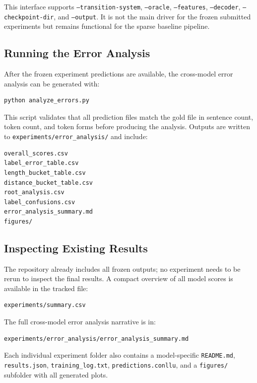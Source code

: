 \documentclass[12pt,letterpaper]{article}
\begin{document}
This interface supports \texttt{--transition-system}, \texttt{--oracle}, \texttt{--features}, \texttt{--decoder}, \texttt{--checkpoint-dir}, and \texttt{--output}. It is not the main driver for the frozen submitted experiments but remains functional for the sparse baseline pipeline.

\subsection{Running the Error Analysis}
\label{subsec:error_analysis}

After the frozen experiment predictions are available, the cross-model error analysis can be generated with:

\begin{verbatim}
python analyze_errors.py
\end{verbatim}

This script validates that all prediction files match the gold file in sentence count, token count, and token forms before producing the analysis. Outputs are written to \newline \texttt{experiments/error\_analysis/} and include:

\begin{verbatim}
overall_scores.csv
label_error_table.csv
length_bucket_table.csv
distance_bucket_table.csv
root_analysis.csv
label_confusions.csv
error_analysis_summary.md
figures/
\end{verbatim}

\subsection{Inspecting Existing Results}
\label{subsec:inspecting_results}

The repository already includes all frozen outputs; no experiment needs to be rerun to inspect the final results. A compact overview of all model scores is available in the tracked file:

\begin{verbatim}
experiments/summary.csv
\end{verbatim}

The full cross-model error analysis narrative is in:

\begin{verbatim}
experiments/error_analysis/error_analysis_summary.md
\end{verbatim}

Each individual experiment folder also contains a model-specific \texttt{README.md}, \texttt{results.json}, \texttt{training\_log.txt}, \texttt{predictions.conllu}, and a \texttt{figures/} subfolder with all generated plots.
\end{document}
